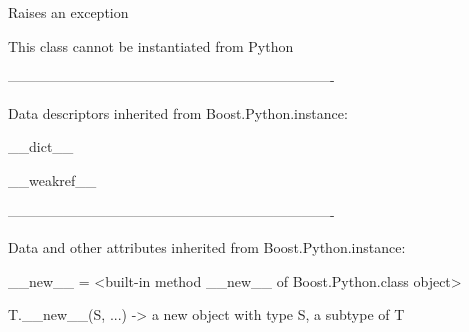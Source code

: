 \documentclass[letterpaper,10pt,english]{sphinxmanual}
\begin{document}
\begin{description}
\begin{description}
\begin{DUlineblock}{0em}
\begin{DUlineblock}{\DUlineblockindent}
\item[] Raises an exception
\item[] This class cannot be instantiated from Python
\item[] 
\end{DUlineblock}
\item[] ----------------------------------------------------------------------
\item[] Data descriptors inherited from Boost.Python.instance:
\item[] 
\item[] \_\_dict\_\_
\item[] 
\item[] \_\_weakref\_\_
\item[] 
\item[] ----------------------------------------------------------------------
\item[] Data and other attributes inherited from Boost.Python.instance:
\item[] 
\item[] \_\_new\_\_ = \textless{}built-in method \_\_new\_\_ of Boost.Python.class object\textgreater{}
\item[]
\begin{DUlineblock}{\DUlineblockindent}
\item[] T.\_\_new\_\_(S, ...) -\textgreater{} a new object with type S, a subtype of T
\end{DUlineblock}
\end{DUlineblock}


\end{description}
\end{description}
\end{document}
